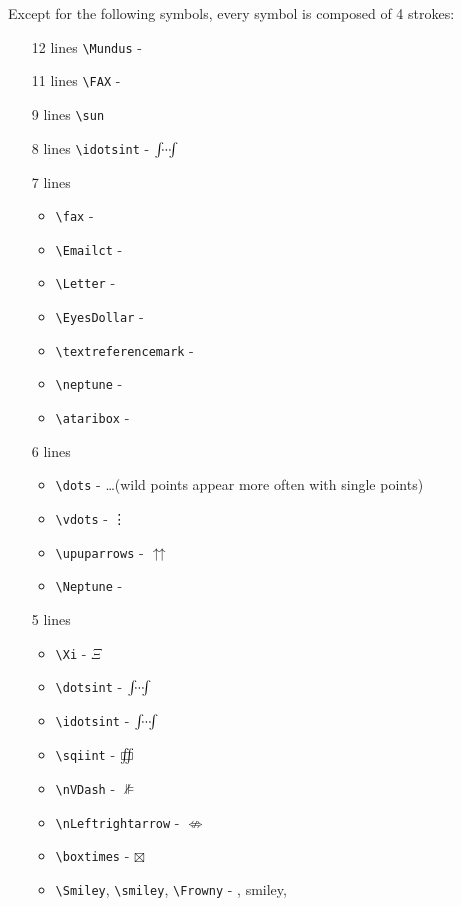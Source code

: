 Except for the following symbols, every symbol is composed of 4 strokes:

\begin{multicols}{2}
\begin{itemize}
    \item[12 lines] \verb+\Mundus+ - \Mundus
    \item[11 lines] \verb+\FAX+ - \FAX
    \item[9 lines] \verb+\sun+
    \item[8 lines] \verb+\idotsint+ - $\idotsint$
    \item[7 lines]
    \begin{itemize}
        \item \verb+\fax+ - \fax
        \item \verb+\Emailct+ - \Emailct
        \item \verb+\Letter+ - \Letter
        \item \verb+\EyesDollar+ - \EyesDollar
        \item \verb+\textreferencemark+ - \textreferencemark
        \item \verb+\neptune+ - %
        \item \verb+\ataribox+ - %
    \end{itemize}
    \item[6 lines]
    \begin{itemize}
        \item \verb+\dots+ - \dots (wild points appear more often with single points)
        \item \verb+\vdots+ - \vdots
        \item \verb+\upuparrows+ - $\upuparrows$
        \item \verb+\Neptune+ - \Neptune
    \end{itemize}
    \item[5 lines]
    \begin{itemize}
        \item \verb+\Xi+ - $\Xi$
        \item \verb+\dotsint+ - $\dotsint$
        \item \verb+\idotsint+ - $\idotsint$
        \item \verb+\sqiint+ - $\sqiint$
        \item \verb+\nVDash+ - $\nVDash$
        \item \verb+\nLeftrightarrow+ - $\nLeftrightarrow$
        \item \verb+\boxtimes+ - $\boxtimes$
        \item \verb+\Smiley+, \verb+\smiley+, \verb+\Frowny+ - \Smiley, smiley, \Frowny

\end{itemize}
\end{itemize}
\end{multicols}

